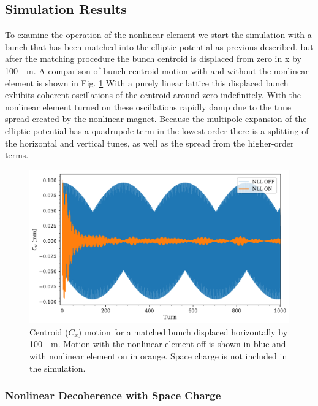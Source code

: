 \documentclass[aps,prstab,twocolumn, groupedaddress]{revtex4-1}
\begin{document}
\subsection{Simulation Results}
To examine the operation of the nonlinear element we start the simulation with a bunch 
that has been matched into the elliptic potential as previous described, but after the 
matching procedure the bunch centroid is displaced from zero in x by \SI{+100}{\mu m}. A 
comparison of bunch centroid motion with and without the nonlinear element is shown in 
Fig. \ref{fig:nll_on-off} With a purely linear lattice this displaced bunch exhibits coherent 
oscillations of the centroid around zero indefinitely. With the nonlinear element turned on 
these oscillations  rapidly damp due to the tune spread created by the nonlinear magnet. 
Because the multipole expansion of the elliptic potential has a 
quadrupole term in the lowest order there is a splitting of the horizontal and vertical 
tunes, as well as the spread from the higher-order terms. 
\begin{figure}
	\includegraphics[width=\columnwidth]{t_on-off_8um.pdf}%
	\caption{\label{fig:nll_on-off} Centroid ($C_x$) motion for a matched bunch displaced 
	horizontally by \SI{100}{\mu m}. Motion with the nonlinear element off is shown in blue 
	and with nonlinear element on in orange. Space charge is not included in the 
	simulation.}
\end{figure}

\subsubsection{Nonlinear Decoherence with Space Charge}
\end{document}
